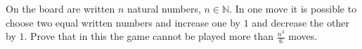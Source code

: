 \begin{problem}[Serbia 2022]
On the board are written $n$ natural numbers, $n\in \mathbb{N}$. In one move it is possible to choose two
equal written numbers and increase one by $1$ and decrease the other by $1$. Prove that in this
the game cannot be played more than $\frac{n^3}{6}$ moves.
\end{problem}


